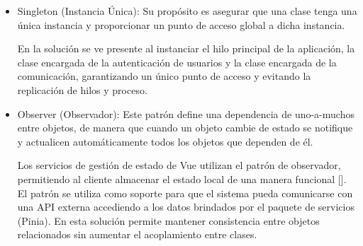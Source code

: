 \begin{itemize}
\item Singleton (Instancia Única): Su propósito es asegurar que una clase tenga una única instancia y proporcionar un punto de acceso global a dicha instancia.

En la solución se ve presente al instanciar el hilo principal de la aplicación, la clase encargada de la autenticación de usuarios y la clase encargada de la comunicación, garantizando un único punto de acceso y evitando la replicación de hilos y proceso.

\item Observer (Observador): Este patrón define una dependencia de uno-a-muchos entre objetos, de manera que cuando un objeto cambie de estado se notifique y actualicen automáticamente todos los objetos que dependen de él.

Los servicios de gestión de estado de Vue utilizan el patrón de observador, permitiendo al cliente almacenar el estado local de una manera funcional [\cite{52}]. El patrón se utiliza como soporte para que el sistema pueda comunicarse con una API externa accediendo a los datos brindados por el paquete de servicios (Pinia). En esta solución permite mantener consistencia entre objetos relacionados sin aumentar el acoplamiento entre clases.

\end{itemize}
%

